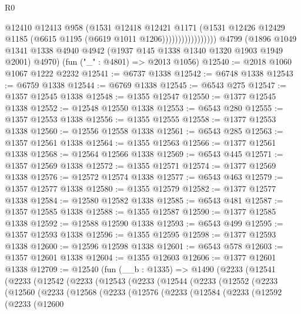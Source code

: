 \begin{lexlean}{R0}
\begin{coremodule}
                              @12410
                              @12413
                              @958
                              (@1531
                                @12418
                                @12421
                                @1171
                                (@1531
                                  @12426
                                  @12429
                                  @1185
                                  (@6615 @1195 (@6619 @1011 @1206)))))))))))))))))
    @4799
    (@1896 @1049 @1341 @1338 @4940 @4942 (@1937 @145 @1338 @1340 @1320 @1903 @1949 @2001) @4970)
    (fun ("_" : @4801) => @2013 @1056)
@12540 := @2018 @1060 @1067 @1222 @2232
@12541 := @6737 @1338
@12542 := @6748 @1338
@12543 := @6759 @1338
@12544 := @6769 @1338
@12545 := @6543 @275
@12547 := @1357 @12545 @1338
@12548 := @1355 @12547
@12550 := @1377 @12545 @1338
@12552 := @12548 @12550 @1338
@12553 := @6543 @280
@12555 := @1357 @12553 @1338
@12556 := @1355 @12555
@12558 := @1377 @12553 @1338
@12560 := @12556 @12558 @1338
@12561 := @6543 @285
@12563 := @1357 @12561 @1338
@12564 := @1355 @12563
@12566 := @1377 @12561 @1338
@12568 := @12564 @12566 @1338
@12569 := @6543 @445
@12571 := @1357 @12569 @1338
@12572 := @1355 @12571
@12574 := @1377 @12569 @1338
@12576 := @12572 @12574 @1338
@12577 := @6543 @463
@12579 := @1357 @12577 @1338
@12580 := @1355 @12579
@12582 := @1377 @12577 @1338
@12584 := @12580 @12582 @1338
@12585 := @6543 @481
@12587 := @1357 @12585 @1338
@12588 := @1355 @12587
@12590 := @1377 @12585 @1338
@12592 := @12588 @12590 @1338
@12593 := @6543 @499
@12595 := @1357 @12593 @1338
@12596 := @1355 @12595
@12598 := @1377 @12593 @1338
@12600 := @12596 @12598 @1338
@12601 := @6543 @578
@12603 := @1357 @12601 @1338
@12604 := @1355 @12603
@12606 := @1377 @12601 @1338
@12709 := @12540
    (fun (__b : @1335) =>
    @1490
      (@2233
        (@12541
          (@2233
            (@12542
              (@2233
                (@12543
                  (@2233
                    (@12544
                      (@2233
                        (@12552
                          (@2233
                            (@12560
                              (@2233
                                (@12568
                                  (@2233
                                    (@12576
                                      (@2233
                                        (@12584
                                          (@2233
                                            (@12592
                                              (@2233
                                                (@12600

\end{coremodule}
\end{lexlean}
